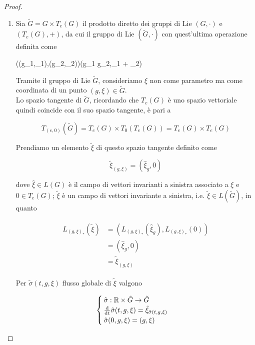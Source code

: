 \begin{proof}\hfill\break
	\begin{enumerate}
		\item Sia $ \tilde{G} = G \times T_{e}(G) $ il prodotto diretto dei gruppi di Lie $ (G,\cdot) $ e $ (T_{e}(G),+) $, da cui il gruppo di Lie $ (\tilde{G},\cdot) $ con quest'ultima operazione definita come
		
		\map{\cdot}%
			{\tilde{G} \times {}}{}%
			{((g_{1},\xi_{1}),(g_{2},\xi_{2}))}{(g_{1} \cdot g_{2},\xi_{1} + \xi_{2})}

		Tramite il gruppo di Lie $  $, consideriamo $ \xi $ non come parametro ma come coordinata di un punto $ (g,\xi) \in \tilde{G} $.\\
		Lo spazio tangente di $ \tilde{G} $, ricordando che $ T_{e}(G) $ è uno spazio vettoriale quindi coincide con il suo spazio tangente, è pari a
		
		\begin{equation}
			T_{(e,0)}(\tilde{G}) = T_{e}(G) \times T_{0}(T_{e}(G)) = T_{e}(G) \times T_{e}(G)
		\end{equation}
	
		Prendiamo un elemento $ \tilde{\xi} $ di questo spazio tangente definito come
		
		\begin{equation}
			\tilde{\xi}_{(g,\xi)} = (\hat{\xi}_{g},0)
		\end{equation}
	
		dove $ \hat{\xi} \in L(G) $ è il campo di vettori invarianti a sinistra associato a $ \xi $ e $ 0 \in T_{e}(G) $; $ \tilde{\xi} $ è un campo di vettori invariante a sinistra, i.e. $ \tilde{\xi} \in L(\tilde{G}) $, in quanto
		
		\begin{align}
			\begin{split}
				L_{(g,\xi)_{*}} \left( \tilde{\xi} \right) &= \left( L_{(g,\xi)_{*}} \left( \hat{\xi}_{g} \right), L_{(g,\xi)_{*}} (0) \right)\\
				&= \left( \hat{\xi}_{g},0 \right)\\
				&= \tilde{\xi}_{(g,\xi)}
			\end{split}
		\end{align}
	
		Per $ \tilde{\sigma}(t,g,\xi) $ flusso globale di $ \tilde{\xi} $ valgono
		
		\begin{equation}
			\begin{cases}
				\tilde{\sigma} : \mathbb{R} \times \tilde{G} \to \tilde{G}\\
				\dv{t} \tilde{\sigma}(t,g,\xi) = \tilde{\xi}_{\tilde{\sigma}(t,g,\xi)}\\
				\tilde{\sigma}(0,g,\xi) = (g,\xi)
			\end{cases}
		\end{equation}
	

\end{enumerate}
\end{proof}
